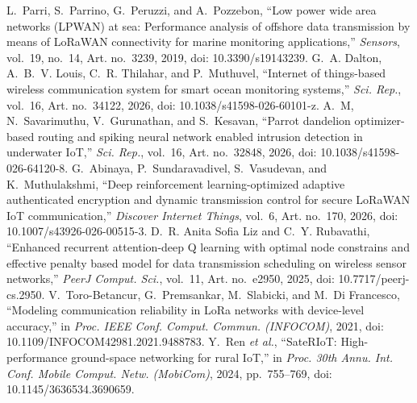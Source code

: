  L.~Parri, S.~Parrino, G.~Peruzzi, and A.~Pozzebon, ``Low power wide area networks (LPWAN) at sea: Performance analysis of offshore data transmission by means of LoRaWAN connectivity for marine monitoring applications,'' \emph{Sensors}, vol.~19, no.~14, Art. no.~3239, 2019, doi: 10.3390/s19143239.
 G.~A. Dalton, A.~B.~V. Louis, C.~R. Thilahar, and P.~Muthuvel, ``Internet of things-based wireless communication system for smart ocean monitoring systems,'' \emph{Sci. Rep.}, vol.~16, Art. no.~34122, 2026, doi: 10.1038/s41598-026-60101-z.
 A.~M, N.~Savarimuthu, V.~Gurunathan, and S.~Kesavan, ``Parrot dandelion optimizer-based routing and spiking neural network enabled intrusion detection in underwater IoT,'' \emph{Sci. Rep.}, vol.~16, Art. no.~32848, 2026, doi: 10.1038/s41598-026-64120-8.
 G.~Abinaya, P.~Sundaravadivel, S.~Vasudevan, and K.~Muthulakshmi, ``Deep reinforcement learning-optimized adaptive authenticated encryption and dynamic transmission control for secure LoRaWAN IoT communication,'' \emph{Discover Internet Things}, vol.~6, Art. no.~170, 2026, doi: 10.1007/s43926-026-00515-3.
 D.~R. Anita Sofia Liz and C.~Y. Rubavathi, ``Enhanced recurrent attention-deep Q learning with optimal node constrains and effective penalty based model for data transmission scheduling on wireless sensor networks,'' \emph{PeerJ Comput. Sci.}, vol.~11, Art. no.~e2950, 2025, doi: 10.7717/peerj-cs.2950.
 V.~Toro-Betancur, G.~Premsankar, M.~Slabicki, and M.~Di Francesco, ``Modeling communication reliability in LoRa networks with device-level accuracy,'' in \emph{Proc. IEEE Conf. Comput. Commun. (INFOCOM)}, 2021, doi: 10.1109/INFOCOM42981.2021.9488783.
 Y.~Ren \emph{et al.}, ``SateRIoT: High-performance ground-space networking for rural IoT,'' in \emph{Proc. 30th Annu. Int. Conf. Mobile Comput. Netw. (MobiCom)}, 2024, pp.~755--769, doi: 10.1145/3636534.3690659.
